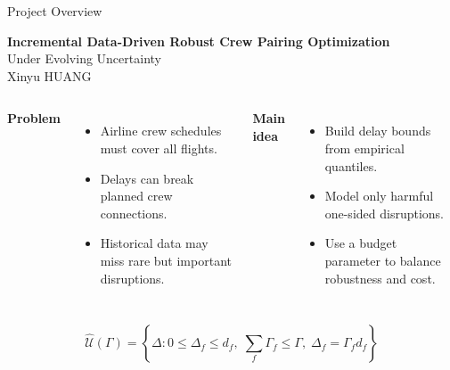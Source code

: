 \documentclass[aspectratio=169]{beamer}
\begin{document}
\begin{frame}{Project Overview}
  \begin{center}
    {\Large \textbf{Incremental Data-Driven Robust Crew Pairing Optimization}}\\
    \vspace{0.08cm}
    {\small Under Evolving Uncertainty}\\
    \vspace{0.12cm}
    {\small Xinyu HUANG}
  \end{center}

  \vspace{0.15cm}
  \begin{columns}[T,onlytextwidth]
      \textbf{Problem}
      \begin{itemize}
        \item Airline crew schedules must cover all flights.
        \item Delays can break planned crew connections.
        \item Historical data may miss rare but important disruptions.
      \end{itemize}

      \textbf{Main idea}
      \begin{itemize}
        \item Build delay bounds from empirical quantiles.
        \item Model only harmful one-sided disruptions.
        \item Use a budget parameter to balance robustness and cost.
      \end{itemize}
  \end{columns}

  \vspace{0.25cm}
  \[
    \hat{\mathcal U}(\Gamma)
    =
    \left\{\Delta: 0 \le \Delta_f \le d_f,\;
    \sum_f \Gamma_f \le \Gamma,\;
    \Delta_f = \Gamma_f d_f \right\}
  \]
\end{frame}
\end{document}
